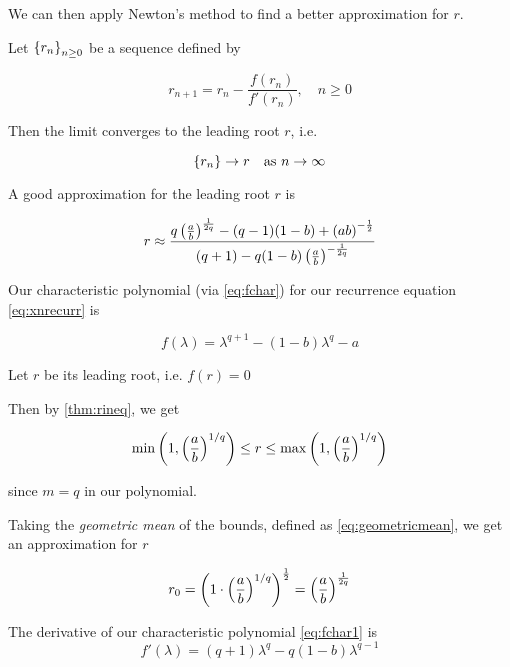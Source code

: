 We can then apply Newton's method \cite{EncyMathNewton} to find a better approximation for $r$.

\begin{definition}
Let $\left\{r_n\right\}_{n\geq0}$ be a sequence defined by

\begin{equation}\label{eq:newtoneq}
r_{n+1} = r_n - \frac{f(r_n)}{f'(r_n)}, \quad n\geq0
\end{equation}

Then the limit converges to the leading root $r$, i.e.

\begin{equation}
\left\{r_n\right\} \to r \quad \text{as } n\to\infty
\end{equation}
\end{definition}

\begin{result}
A good approximation for the leading root $r$ is 

\begin{equation} \label{eq:req1}
r\approx  \frac{q\left(\frac{a}{b}\right)^{\frac{1}{2q}} - (q-1)(1-b) + \left(ab\right)^{-\frac12}}{(q+1) - q(1-b)\left(\frac{a}{b}\right)^{-\frac{1}{2q}}}
\end{equation}

\begin{pf}
Our characteristic polynomial (via \ref{eq:fchar}) for our recurrence equation \ref{eq:xnrecurr} is

\begin{equation} \label{eq:fchar1}
f(\lambda) = \lambda^{q+1} - (1-b)\lambda^q - a
\end{equation}

Let $r$ be its leading root, i.e. $f(r)=0$ 

Then by \ref{thm:rineq}, we get 

\begin{equation}
 \min\left(1,\left(\frac{a}{b}\right)^{1/q}\right)\leq r \leq \max\left(1,\left(\frac{a}{b}\right)^{1/q}\right)
\end{equation}

since $m=q$ in our polynomial.

Taking the \textit{geometric mean} of the bounds, defined as \ref{eq:geometricmean}, we get an approximation for $r$

\begin{equation}
r_0 = \left(1\cdot \left(\frac{a}{b}\right)^{1/q}\right)^{\frac12}= \left(\frac{a}{b}\right)^{\frac1{2q}}
\end{equation}

The derivative of our characteristic polynomial \ref{eq:fchar1} is
\begin{equation} \label{eq:fcharprime1}
f'(\lambda) = (q+1)\lambda^q - q(1-b)\lambda^{q-1}
\end{equation}


\end{pf}
\end{result}

